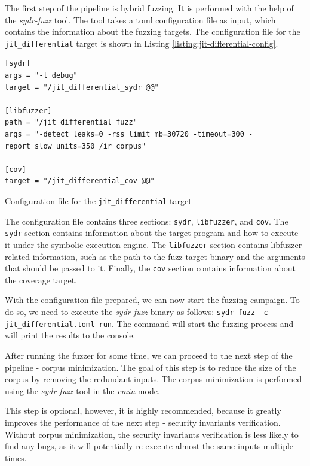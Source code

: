 The first step of the pipeline is hybrid fuzzing. It is performed with the help of the \textit{sydr-fuzz} tool. The tool takes a toml configuration file as input, which contains the information about the fuzzing targets. The configuration file for the \texttt{jit\_differential} target is shown in Listing \ref{listing:jit-differential-config}.

\begin{listing}[h]
    \centering
    \begin{minipage}{.75\linewidth}
        \begin{verbatim}
[sydr]
args = "-l debug"
target = "/jit_differential_sydr @@"

[libfuzzer]
path = "/jit_differential_fuzz"
args = "-detect_leaks=0 -rss_limit_mb=30720 -timeout=300 -report_slow_units=350 /ir_corpus"

[cov]
target = "/jit_differential_cov @@"
\end{verbatim}
    \end{minipage}
    \caption{Configuration file for the \texttt{jit\_differential} target}
    \label{listing:jit-differential-config}
\end{listing}

The configuration file contains three sections: \texttt{sydr}, \texttt{libfuzzer}, and \texttt{cov}. The \texttt{sydr} section contains information about the target program and how to execute it under the symbolic execution engine. The \texttt{libfuzzer} section contains libfuzzer-related information, such as the path to the fuzz target binary and the arguments that should be passed to it. Finally, the \texttt{cov} section contains information about the coverage target.

With the configuration file prepared, we can now start the fuzzing campaign. To do so, we need to execute the \textit{sydr-fuzz} binary as follows: \texttt{sydr-fuzz -c jit\_differential.toml run}. The command will start the fuzzing process and will print the results to the console.


After running the fuzzer for some time, we can proceed to the next step of the pipeline - corpus minimization. The goal of this step is to reduce the size of the corpus by removing the redundant inputs. The corpus minimization is performed using the \textit{sydr-fuzz} tool in the \textit{cmin} mode.

This step is optional, however, it is highly recommended, because it greatly improves the performance of the next step - security invariants verification. Without corpus minimization, the security invariants verification is less likely to find any bugs, as it will potentially re-execute almost the same inputs multiple times.

